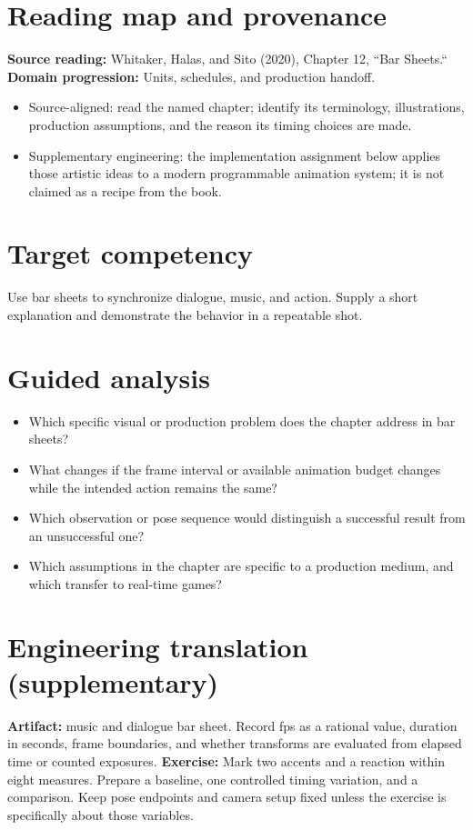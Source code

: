 \documentclass[10pt,letterpaper]{article}
\begin{document}
\makedoctitle
\makedocsummary

\section{Reading map and provenance}
\textbf{Source reading:} Whitaker, Halas, and Sito (2020), Chapter 12, ``Bar Sheets.``\\
\textbf{Domain progression:} Units, schedules, and production handoff.
\begin{itemize}
\item Source-aligned: read the named chapter; identify its terminology, illustrations, production assumptions, and the reason its timing choices are made.
\item Supplementary engineering: the implementation assignment below applies those artistic ideas to a modern programmable animation system; it is not claimed as a recipe from the book.
\end{itemize}
\section{Target competency}
Use bar sheets to synchronize dialogue, music, and action. Supply a short explanation and demonstrate the behavior in a repeatable shot.
\section{Guided analysis}
\begin{itemize}
\item Which specific visual or production problem does the chapter address in bar sheets?
\item What changes if the frame interval or available animation budget changes while the intended action remains the same?
\item Which observation or pose sequence would distinguish a successful result from an unsuccessful one?
\item Which assumptions in the chapter are specific to a production medium, and which transfer to real-time games?
\end{itemize}
\section{Engineering translation (supplementary)}
\textbf{Artifact:} music and dialogue bar sheet. Record fps as a rational value, duration in seconds, frame boundaries, and whether transforms are evaluated from elapsed time or counted exposures.
\textbf{Exercise:} Mark two accents and a reaction within eight measures. Prepare a baseline, one controlled timing variation, and a comparison. Keep pose endpoints and camera setup fixed unless the exercise is specifically about those variables.
\end{document}
